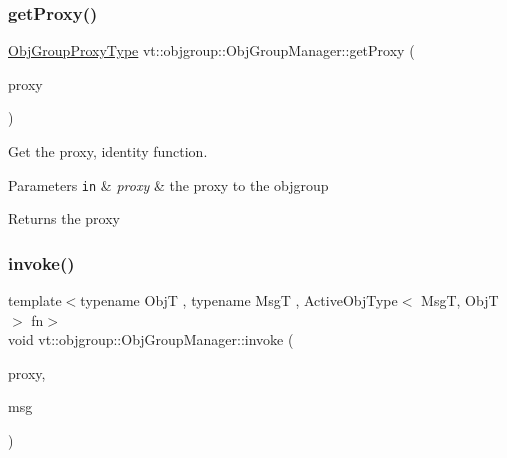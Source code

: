 \subsubsection{\texorpdfstring{get\+Proxy()}{getProxy()}\hspace{0.1cm}{\footnotesize\ttfamily [2/2]}}
{\footnotesize\ttfamily \hyperlink{namespacevt_ad7cae989df485fccca57f0792a880a8e}{Obj\+Group\+Proxy\+Type} vt\+::objgroup\+::\+Obj\+Group\+Manager\+::get\+Proxy (\begin{DoxyParamCaption}\item[{\hyperlink{namespacevt_ad7cae989df485fccca57f0792a880a8e}{Obj\+Group\+Proxy\+Type}}]{proxy }\end{DoxyParamCaption})}



Get the proxy, identity function. 


\begin{DoxyParams}[1]{Parameters}
\mbox{\tt in}  & {\em proxy} & the proxy to the objgroup\\
\hline
\end{DoxyParams}
\begin{DoxyReturn}{Returns}
the proxy 
\end{DoxyReturn}
\mbox{\label{structvt_1_1objgroup_1_1_obj_group_manager_a5ff347b7aca2c08892d3206c4b028fd3}} 
\subsubsection{\texorpdfstring{invoke()}{invoke()}\hspace{0.1cm}{\footnotesize\ttfamily [1/3]}}
{\footnotesize\ttfamily template$<$typename ObjT , typename MsgT , Active\+Obj\+Type$<$ Msg\+T, Obj\+T $>$ fn$>$ \\
void vt\+::objgroup\+::\+Obj\+Group\+Manager\+::invoke (\begin{DoxyParamCaption}\item[{\hyperlink{structvt_1_1objgroup_1_1_obj_group_manager_adba6c8ecb0f4c30e719f1abb995cfc9b}{Proxy\+Elm\+Type}$<$ ObjT $>$}]{proxy,  }\item[{\hyperlink{structvt_1_1messaging_1_1_msg_ptr_thief}{messaging\+::\+Msg\+Ptr\+Thief}$<$ MsgT $>$}]{msg }\end{DoxyParamCaption})}



